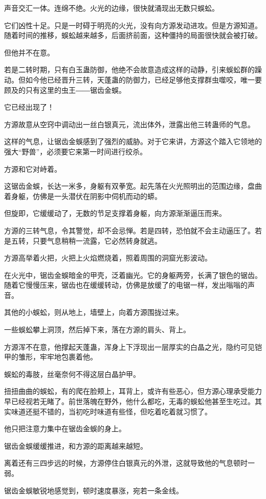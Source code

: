 \begin{this_body}
声音交汇一体。连绵不绝。火光的边缘，很快就涌现出无数只蜈蚣。

它们凶性十足。只是一时碍于明亮的火光，没有向方源发动进攻。但是方源知道。随着时间的推移，蜈蚣越来越多，后面挤前面，这种僵持的局面很快就会被打破。

但他并不在意。

若是二转时期，只有白玉蛊防御，他绝不会故意造成这样的动静，引来蜈蚣群的躁动。但如今他已经晋升三转，天蓬蛊的防御力，已经足够他支撑群虫噬咬，唯一要顾及的只有这里的虫王――锯齿金蜈。

它已经出现了！

方源故意从空窍中调动出一丝白银真元，流出体外，泄露出他三转蛊师的气息。

这样的气息，让锯齿金蜈感到了强烈的威胁。对于它来讲，方源这个踏入它领地的强大“野兽”，必须要它来第一时间进行绞杀。

方源和它对峙着。

这锯齿金蜈，长达一米多，身躯有双拳宽。起先落在火光照明出的范围边缘，盘曲着身躯，仿佛是一头潜伏在阴影中伺机而动的蟒。

但旋即，它缓缓动了，无数的节足支撑着身躯，向方源渐渐逼压而来。

方源的三转气息，令其警觉，却不会忌惮。若是四转，恐怕就不会主动逼压了。若是五转，只要气息稍稍一流露，它必然转身就逃。

方源高举着火把，火把上火焰燃烧着，照着周围的洞窟光影波动。

在火光中，锯齿金蜈暗金的甲壳，泛着幽光。它的身躯两旁，长满了银色的锯齿。随着它慢慢压来，锯齿也在缓缓转动，仿佛是放缓了的电锯一样，发出嗡嗡的声音。

其他的小蜈蚣，则从地上，墙壁上，向着方源围拢过来。

一些蜈蚣攀上洞顶，然后掉下来，落在方源的肩头、背上。

方源浑不在意，他撑起天蓬蛊，浑身上下浮现出一层厚实的白晶之光，隐约可见铠甲的雏形，牢牢地包裹着他。

蜈蚣的毒肢，丝毫奈何不得这层白晶护甲。

扭扭曲曲的蜈蚣，有的爬在脸颊上，耳背上，或许有些恶心，但方源心理承受能力早已经视若无睹了。前世落魄在野外，他什么都吃，无毒的蜈蚣他甚至生吃过。其实味道还挺不错的，当初吃时味道有些怪，但吃着吃着就习惯了。

他只把注意力集中在锯齿金蜈的身上。

锯齿金蜈缓缓推进，和方源的距离越来越短。

离着还有三四步远的时候，方源停住白银真元的外泄，这就导致他的气息顿时一弱。

锯齿金蜈敏锐地感觉到，顿时速度暴涨，宛若一条金线。


\end{this_body}
